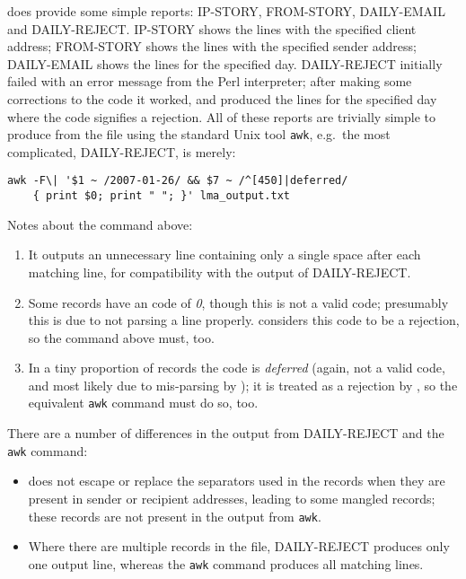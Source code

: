 \LMA{} does provide some simple reports: IP-STORY, FROM-STORY, DAILY-EMAIL
and DAILY-REJECT\@.  IP-STORY shows the \CSV{} lines with the specified
client \IP{} address; FROM-STORY shows the \CSV{} lines with the specified
sender address; DAILY-EMAIL shows the \CSV{} lines for the specified day.
DAILY-REJECT initially failed with an error message from the Perl
interpreter; after making some corrections to the code it worked, and
produced the \CSV{} lines for the specified day where the \SMTP{} code
signifies a rejection.  All of these reports are trivially simple to
produce from the \CSV{} file using the standard Unix tool \texttt{awk},
e.g.\ the most complicated, DAILY-REJECT, is merely:

\begin{verbatim}
awk -F\| '$1 ~ /2007-01-26/ && $7 ~ /^[450]|deferred/
    { print $0; print " "; }' lma_output.txt
\end{verbatim}

Notes about the command above:

\begin{enumerate}

    \item It outputs an unnecessary line containing only a single space
        after each matching line, for compatibility with the output of
        DAILY-REJECT\@.

    \item Some records have an \SMTP{} code of \textit{0}, though this is
        not a valid \SMTP{} code; presumably this is due to \LMA{} not
        parsing a line properly.  \LMA{} considers this code to be a
        rejection, so the command above must, too.

    \item In a tiny proportion of records the \SMTP{} code is
        \textit{deferred\/} (again, not a valid code, and most likely due
        to mis-parsing by \LMA{}); it is treated as a rejection by \LMA{},
        so the equivalent \texttt{awk} command must do so, too.

\end{enumerate}

There are a number of differences in the output from DAILY-REJECT and the
\texttt{awk} command:

\begin{itemize}

    \item \LMA{} does not escape or replace the separators used in the
        \CSV{} records when they are present in sender or recipient
        addresses, leading to some mangled records; these records are not
        present in the output from \texttt{awk}.

    \item Where there are multiple records in the \CSV{} file, DAILY-REJECT
        produces only one output line, whereas the \texttt{awk} command
        produces all matching lines.

\end{itemize}

